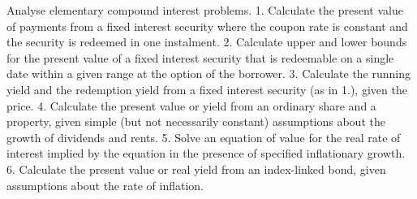 Analyse elementary compound interest problems.
1. Calculate the present value of payments from a fixed interest security where the coupon rate is constant and the security is redeemed in one instalment.
2. Calculate upper and lower bounds for the present value of a fixed interest security that is redeemable on a single date within a given range at the option of the borrower.
3. Calculate the running yield and the redemption yield from a fixed interest security (as in 1.), given the price.
4. Calculate the present value or yield from an ordinary share and a property, given simple (but not necessarily constant) assumptions about the growth of dividends and rents.
5. Solve an equation of value for the real rate of interest implied by the equation in the presence of specified inflationary growth.
6. Calculate the present value or real yield from an index-linked bond, given assumptions about the rate of inflation.
